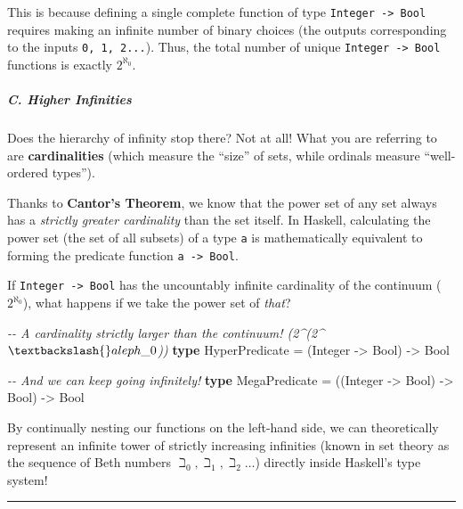 \documentclass[
]{article}
\newenvironment{Shaded}{}{}
\newcommand{\CommentTok}[1]{\textcolor[rgb]{0.38,0.63,0.69}{\textit{#1}}}
\newcommand{\DataTypeTok}[1]{\textcolor[rgb]{0.56,0.13,0.00}{#1}}
\newcommand{\KeywordTok}[1]{\textcolor[rgb]{0.00,0.44,0.13}{\textbf{#1}}}
\newcommand{\NormalTok}[1]{#1}
\newcommand{\OtherTok}[1]{\textcolor[rgb]{0.00,0.44,0.13}{#1}}
\begin{document}
This is because defining a single complete function of type
\texttt{Integer\ -\textgreater{}\ Bool} requires making an infinite
number of binary choices (the outputs corresponding to the inputs
\texttt{0,\ 1,\ 2...}). Thus, the total number of unique
\texttt{Integer\ -\textgreater{}\ Bool} functions is exactly
\(2^{\aleph_0}\).

\subparagraph{C. Higher Infinities}\label{c.-higher-infinities}

Does the hierarchy of infinity stop there? Not at all! What you are
referring to are \textbf{cardinalities} (which measure the ``size'' of
sets, while ordinals measure ``well-ordered types'').

Thanks to \textbf{Cantor's Theorem}, we know that the power set of any
set always has a \emph{strictly greater cardinality} than the set
itself. In Haskell, calculating the power set (the set of all subsets)
of a type \texttt{a} is mathematically equivalent to forming the
predicate function \texttt{a\ -\textgreater{}\ Bool}.

If \texttt{Integer\ -\textgreater{}\ Bool} has the uncountably infinite
cardinality of the continuum (\(2^{\aleph_0}\)), what happens if we take
the power set of \emph{that}?

\begin{Shaded}
\begin{Highlighting}[]
\CommentTok{{-}{-} A cardinality strictly larger than the continuum! (2\^{}(2\^{}$\textbackslash{}aleph\_0$))}
\KeywordTok{type} \DataTypeTok{HyperPredicate} \OtherTok{=}\NormalTok{ (}\DataTypeTok{Integer} \OtherTok{{-}\textgreater{}} \DataTypeTok{Bool}\NormalTok{) }\OtherTok{{-}\textgreater{}} \DataTypeTok{Bool}

\CommentTok{{-}{-} And we can keep going infinitely!}
\KeywordTok{type} \DataTypeTok{MegaPredicate} \OtherTok{=}\NormalTok{ ((}\DataTypeTok{Integer} \OtherTok{{-}\textgreater{}} \DataTypeTok{Bool}\NormalTok{) }\OtherTok{{-}\textgreater{}} \DataTypeTok{Bool}\NormalTok{) }\OtherTok{{-}\textgreater{}} \DataTypeTok{Bool}
\end{Highlighting}
\end{Shaded}

By continually nesting our functions on the left-hand side, we can
theoretically represent an infinite tower of strictly increasing
infinities (known in set theory as the sequence of Beth numbers
\(\beth_0, \beth_1, \beth_2\dots\)) directly inside Haskell's type
system!

\begin{center}\rule{0.5\linewidth}{0.5pt}\end{center}
\end{document}
